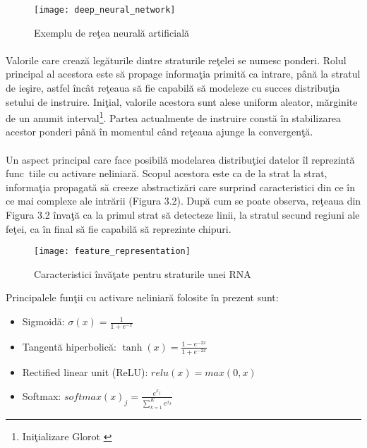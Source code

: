 \begin{figure}[H]
\centering
\texttt{[image: deep\_neural\_network]}
\caption{Exemplu de re\c tea neural\u a artificial\u a}
\end{figure}

\paragraph{}
Valorile care creaz\u a leg\u aturile dintre straturile re\c telei se numesc ponderi. Rolul principal al acestora este s\u a propage informa\c tia primit\u a ca intrare, p\^ an\u a la stratul de ie\c sire, astfel \^ inc\^ at re\c teaua s\u a fie capabil\u a s\u a modeleze cu succes distribu\c tia setului de instruire. Ini\c tial, valorile acestora sunt alese uniform aleator, m\u arginite de un anumit interval\footnote{Ini\c tializare Glorot \cite{GlorotAISTATS2010}}. Partea actualmente de instruire const\u a \^ in stabilizarea acestor ponderi p\^ an\u a \^ in momentul c\^ and re\c teaua ajunge la convergen\c t\u a.

\paragraph{}
Un aspect principal care face posibil\u a modelarea distribu\c tiei datelor \^ il reprezint\u a func\ tiile cu activare neliniar\u a. Scopul acestora este ca de la strat la strat, informa\c tia propagat\u a s\u a creeze abstractiz\u ari care surprind caracteristici din ce \^ in ce mai complexe ale intr\u arii (Figura 3.2). Dup\u a cum se poate observa, re\c teaua din Figura 3.2 \^ inva\c t\u a ca la primul strat s\u a detecteze linii, la stratul secund regiuni ale fe\c tei, ca \^ in final s\u a fie capabil\u a s\u a reprezinte chipuri.

\begin{figure}[H]
\centering
\texttt{[image: feature\_representation]}
\caption{Caracteristici \^ inv\u a\c tate pentru straturile unei RNA}
\end{figure}

Principalele fun\c tii cu activare neliniar\u a folosite \^ in prezent sunt:

\begin{itemize}
	\item Sigmoid\u a: \(\sigma(x)=\frac{1}{1+e^{-x}}\)
	\item Tangent\u a hiperbolic\u a: \(\tanh(x)=\frac{1-e^{-2x}}{1+e^{-2x}}\)
	\item Rectified linear unit (ReLU): \(relu(x)=max(0,x)\)
	\item Softmax: \(softmax(x)_j=\frac{e^{x_j}}{\sum_{k=1}^{K}e^{x_k}}\)
\end{itemize}

